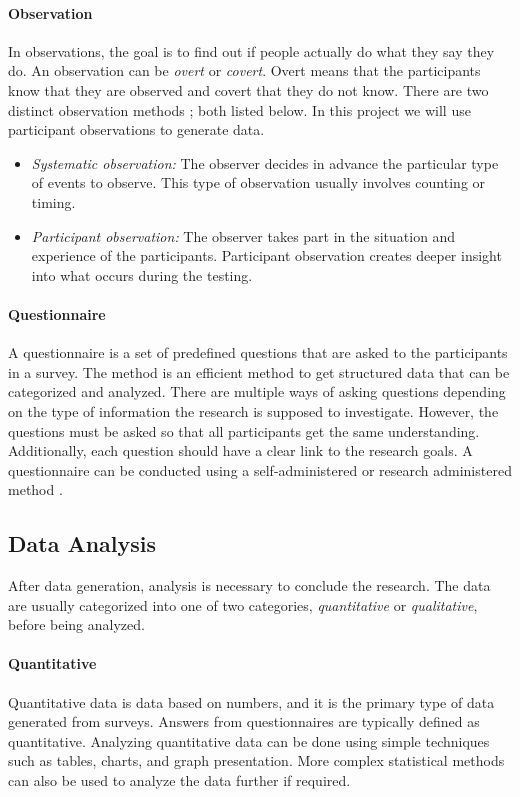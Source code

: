 \paragraph*{Observation}
In observations, the goal is to find out if people actually do what they say they do. An observation can be \textit{overt} or \textit{covert}. Overt means that the participants know that they are observed and covert that they do not know. There are two distinct observation methods \citep{oates_researching_2006}; both listed below. In this project we will use participant observations to generate data.
\begin{itemize}
    \item \textit{Systematic observation:} The observer decides in advance the particular type of events to observe. This type of observation usually involves counting or timing.
    \item \textit{Participant observation:} The observer takes part in the situation and experience of the participants. Participant observation creates deeper insight into what occurs during the testing.
\end{itemize}

\paragraph*{Questionnaire}
A questionnaire is a set of predefined questions that are asked to the participants in a survey. The method is an efficient method to get structured data that can be categorized and analyzed. There are multiple ways of asking questions depending on the type of information the research is supposed to investigate. However, the questions must be asked so that all participants get the same understanding. Additionally, each question should have a clear link to the research goals. A questionnaire can be conducted using a self-administered or research administered method \citep{oates_researching_2006}.

\subsection{Data Analysis}
After data generation, analysis is necessary to conclude the research. The data are usually categorized into one of two categories, \textit{quantitative} or \textit{qualitative},
before being analyzed.

\paragraph*{Quantitative}
Quantitative data is data based on numbers, and it is the primary type of data generated from surveys. Answers from questionnaires are typically defined as quantitative. Analyzing quantitative data can be done using simple techniques such as tables, charts, and graph presentation. More complex statistical methods can also be used to analyze the data further if required.

